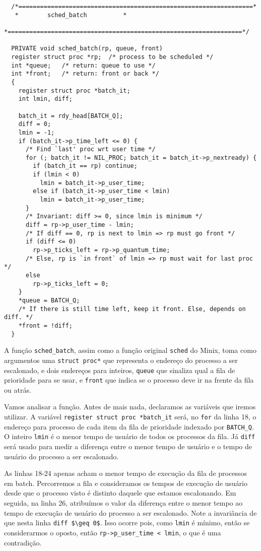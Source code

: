 \documentclass{amsart}
\theoremstyle{plain}
\newcommand{\code}[1]{\lstinline[mathescape=true]{#1}}
\newcommand{\mcode}[1]{\lstinline[mathescape]!#1!}
\begin{document}
\begin{verbatim}
  /*=================================================================*
   *        sched_batch          *
   *=================================================================*/

  PRIVATE void sched_batch(rp, queue, front)
  register struct proc *rp;  /* process to be scheduled */
  int *queue;   /* return: queue to use */
  int *front;   /* return: front or back */
  {
    register struct proc *batch_it;
    int lmin, diff;

    batch_it = rdy_head[BATCH_Q];
    diff = 0;
    lmin = -1;
    if (batch_it->p_time_left <= 0) {
      /* Find `last' proc wrt user time */
      for (; batch_it != NIL_PROC; batch_it = batch_it->p_nextready) {
        if (batch_it == rp) continue;
        if (lmin < 0)
          lmin = batch_it->p_user_time;
        else if (batch_it->p_user_time < lmin)
          lmin = batch_it->p_user_time;
      }
      /* Invariant: diff >= 0, since lmin is minimum */
      diff = rp->p_user_time - lmin;
      /* If diff == 0, rp is next to lmin => rp must go front */
      if (diff <= 0)
        rp->p_ticks_left = rp->p_quantum_time;
      /* Else, rp is `in front` of lmin => rp must wait for last proc */
      else
        rp->p_ticks_left = 0;
    }
    *queue = BATCH_Q;
    /* If there is still time left, keep it front. Else, depends on diff. */
    *front = !diff;
  }
\end{verbatim}

A função \code{sched_batch}, assim como a função original \code{sched} do Minix, toma como
argumentos uma \code{struct proc*} que representa o endereço do processo a ser escalonado, e dois
endereços para inteiros, \code{queue} que sinaliza qual a fila de prioridade para se usar, e
\code{front} que indica se o processo deve ir na frente da fila ou atrás.

Vamos analisar a função. Antes de mais nada, declaramos as variáveis que iremos utilizar. A
variável \code{register struct proc *batch_it} será, no \code{for} da linha 18, o endereço para
processo de cada item da fila de prioridade indexado por \code{BATCH_Q}. O inteiro \code{lmin}
é o menor tempo de usuário de todos os processos da fila. Já \code{diff} será usado para medir a
diferença entre o menor tempo de usuário e o tempo de usuário do processo a ser escalonado.

As linhas 18-24 apenas acham o menor tempo de execução da fila de processos em batch. Percorremos
a fila e consideramos os tempos de execução de usuário desde que o processo visto é distinto
daquele que estamos escalonando. Em seguida, na linha 26, atribuímos o valor da diferença entre o
menor tempo ao tempo de execução de usuário do processo a ser escalonado. Note a invariância de que
nesta linha \mcode{diff $\geq 0$}. Isso ocorre pois, como \code{lmin} é mínimo, então se
considerarmos o oposto, então \code{rp->p_user_time < lmin}, o que é uma contradição.
\end{document}
